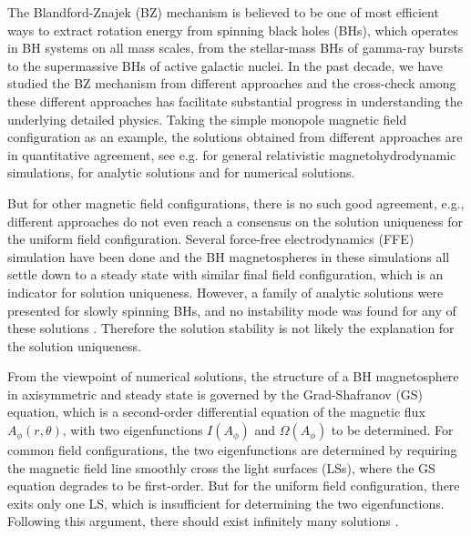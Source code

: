\documentclass[aps,prd,reprint,nofootinbib, superscriptaddress]{revtex4-1}
\def\Ap{A_\phi}
\begin{document}
The Blandford-Znajek (BZ) mechanism \cite{Blandford1977} is believed to be
one of most efficient ways to extract rotation energy from spinning black holes (BHs),
which operates in BH systems on all mass scales, from the stellar-mass BHs of gamma-ray
bursts to the supermassive BHs of active galactic nuclei. In the past decade,
we have studied the BZ mechanism from different approaches and the cross-check among
these different approaches has facilitate substantial progress in understanding the underlying
detailed physics. Taking the simple monopole magnetic field
configuration as an example, the solutions obtained from different approaches
are in quantitative agreement,  see e.g. \cite{Komissarov2001,Komissarov2004,Komissarov2004e, McKinney2004}
for general relativistic magnetohydrodynamic simulations,
\cite{Tanabe2008,Pan2015,Pan2015b, Gralla2014, Gralla2015, Penna2015, Grignani2018} for analytic solutions
and \cite{Contopoulos2013,Nathanail2014,Mahlmann2018} for numerical solutions.

But for other magnetic field configurations, there is no such good agreement, e.g.,
different approaches do not even reach a consensus on the solution uniqueness for the uniform field configuration.
Several force-free electrodynamics (FFE) simulation \cite{Komissarov2004e, Komissarov2005,
Komissarov2007,Palenzuela2010,Paschalidis2013,Yang2015,Carrasco2017} have been done and
the BH magnetospheres in these simulations all settle down to a steady state with similar final field configuration,
which is an indicator for solution uniqueness.
However, a family of analytic solutions were presented for slowly spinning BHs,
and no instability mode was found for any of these solutions \cite{Yang2015}. Therefore the solution stability
is not likely the explanation for the solution uniqueness.

From the viewpoint of numerical solutions, the structure of a BH magnetosphere in axisymmetric and
steady state is governed by the Grad-Shafranov (GS) equation, which is a second-order differential equation of
the magnetic flux $\Ap(r,\theta)$, with two eigenfunctions $I(\Ap)$ and $\Omega(\Ap)$ to be
determined. For common field configurations, the two eigenfunctions are determined by requiring the
magnetic field line smoothly cross the light surfaces (LSs), where the GS equation degrades to be first-order.
But for the uniform field configuration, there exits only one LS, which is insufficient for determining
the two eigenfunctions. Following this argument, there should exist infinitely many solutions \cite{Nathanail2014}.
\end{document}
